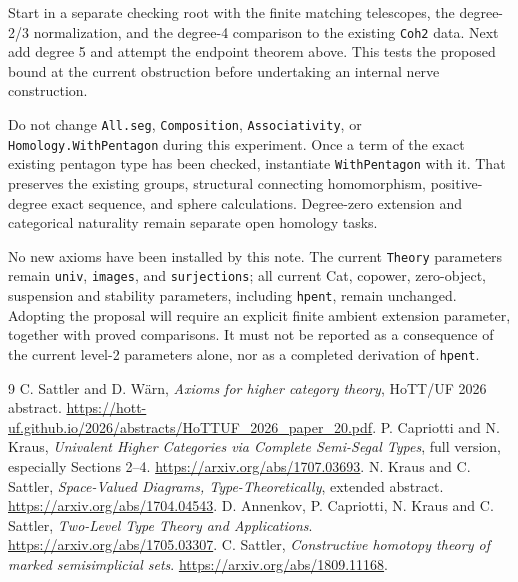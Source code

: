 \documentclass[11pt]{amsart}
\newcommand{\code}[1]{\nolinkurl{#1}}
\theoremstyle{definition}
\begin{document}
Start in a separate checking root with the finite matching telescopes,
the degree-2/3 normalization, and the degree-4 comparison to the
existing \code{Coh2} data. Next add degree 5 and attempt the endpoint
theorem above. This tests the proposed bound at the current obstruction
before undertaking an internal nerve construction.

Do not change \code{All.seg}, \code{Composition}, \code{Associativity},
or \code{Homology.WithPentagon} during this experiment. Once a term of
the exact existing pentagon type has been checked, instantiate
\code{WithPentagon} with it. That preserves the existing groups,
structural connecting homomorphism, positive-degree exact sequence,
and sphere calculations. Degree-zero extension and categorical
naturality remain separate open homology tasks.

No new axioms have been installed by this note. The current
\code{Theory} parameters remain \code{univ}, \code{images}, and
\code{surjections}; all current Cat, copower, zero-object, suspension
and stability parameters, including \code{hpent}, remain unchanged.
Adopting the proposal will require an explicit finite ambient extension
parameter, together with proved comparisons. It must not be reported
as a consequence of the current level-2 parameters alone, nor as a
completed derivation of \code{hpent}.

\begin{thebibliography}{9}
 C. Sattler and D. W\"arn,
\emph{Axioms for higher category theory}, HoTT/UF 2026 abstract.
\url{https://hott-uf.github.io/2026/abstracts/HoTTUF_2026_paper_20.pdf}.
 P. Capriotti and N. Kraus,
\emph{Univalent Higher Categories via Complete Semi-Segal Types},
full version, especially Sections 2--4.
\url{https://arxiv.org/abs/1707.03693}.
 N. Kraus and C. Sattler,
\emph{Space-Valued Diagrams, Type-Theoretically}, extended abstract.
\url{https://arxiv.org/abs/1704.04543}.
 D. Annenkov, P. Capriotti, N. Kraus and C. Sattler,
\emph{Two-Level Type Theory and Applications}.
\url{https://arxiv.org/abs/1705.03307}.
 C. Sattler,
\emph{Constructive homotopy theory of marked semisimplicial sets}.
\url{https://arxiv.org/abs/1809.11168}.
\end{thebibliography}
\end{document}
